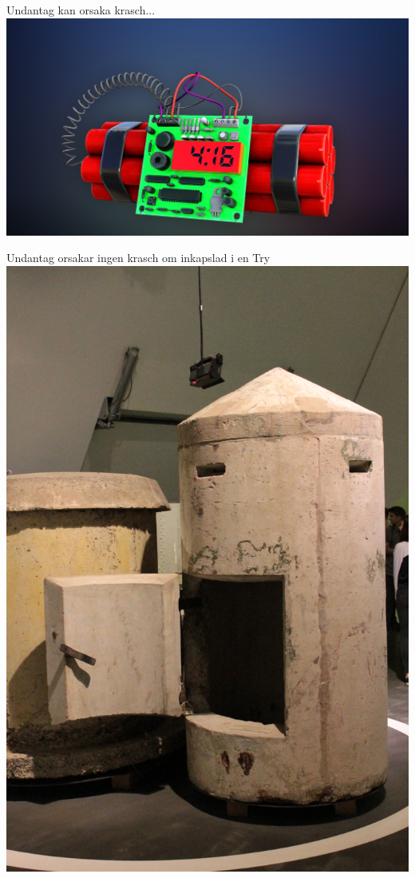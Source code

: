 




\ifkompendium\else
\begin{SlideExtra}{Undantag kan orsaka krasch...}
\includegraphics[width=1.0\textwidth]{../img/dynamite}  
\end{SlideExtra}

\begin{SlideExtra}{Undantag orsakar ingen krasch om inkapslad i en Try}
\includegraphics[width=1.0\textwidth]{../img/bomb-shelter}  
\end{SlideExtra}
\fi


